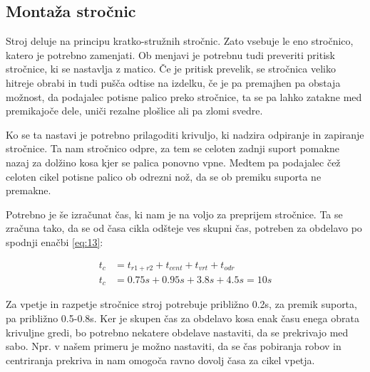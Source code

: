\newpage

\subsection{Montaža stročnic}
Stroj deluje na principu kratko-stružnih stročnic. Zato vsebuje le eno stročnico,
katero je potrebno zamenjati. Ob menjavi je potrebnu tudi preveriti pritisk
stročnice, ki se nastavlja z matico. Če je pritisk prevelik, se stročnica veliko
hitreje obrabi in tudi pušča odtise na izdelku, če je pa premajhen pa obstaja možnost,
da podajalec potisne palico preko stročnice, ta se pa lahko zatakne med
premikajoče dele, uniči rezalne plošlice ali pa zlomi svedre.

Ko se ta nastavi je potrebno prilagoditi krivuljo, ki nadzira odpiranje in
zapiranje stročnice. Ta nam stročnico odpre, za tem se celoten zadnji suport
pomakne nazaj za dolžino kosa kjer se palica ponovno vpne. Medtem pa podajalec
čež celoten cikel potisne palico ob odrezni nož, da se ob premiku suporta ne premakne.

Potrebno je še izračunat čas, ki nam je na voljo za preprijem stročnice.
Ta se zračuna tako, da se od časa cikla odšteje ves skupni čas, potreben
za obdelavo po spodnji enačbi \ref{eq:13}:

\begin{equation}
	\label{eq:13}
	\begin{split}
		t_c &= t_{r1+r2} + t_{cent} + t_{vrt} + t_{odr} \\
		t_c &= 0.75s + 0.95s + 3.8s + 4.5s = 10s
	\end{split}
\end{equation}

Za vpetje in razpetje stročnice stroj potrebuje približno 0.2s, za premik
suporta, pa približno 0.5-0.8s. Ker je skupen čas za obdelavo kosa
enak času enega obrata krivuljne gredi, bo potrebno nekatere obdelave
nastaviti, da se prekrivajo med sabo. Npr. v našem primeru je možno
nastaviti, da se čas pobiranja robov in centriranja prekriva in
nam omogoča ravno dovolj časa za cikel vpetja.